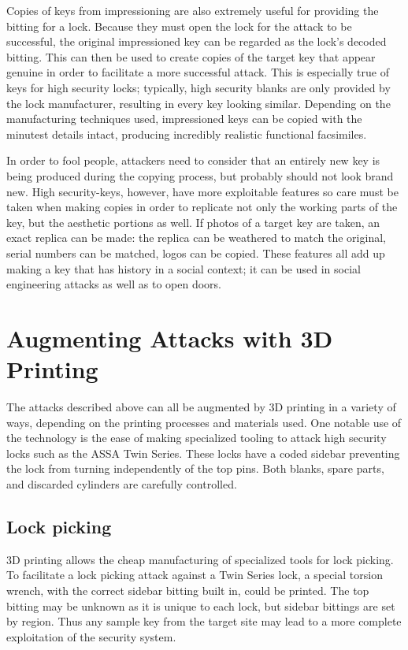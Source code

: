 \documentclass{acm_proc_article-sp}
\begin{document}
Copies of keys from impressioning are also extremely useful for providing the bitting for a lock. Because they must open the lock for the attack to be successful, the original impressioned key can be regarded as the lock's decoded bitting. This can then be used to create copies of the target key that appear genuine in order to facilitate a more successful attack. This is especially true of keys for high security locks; typically, high security blanks are only provided by the lock manufacturer, resulting in every key looking similar. Depending on the manufacturing techniques used, impressioned keys can be copied with the minutest details intact, producing incredibly realistic functional facsimiles.

In order to fool people, attackers need to consider that an entirely new key is being produced during the copying process, but probably should not look brand new. High security-keys, however, have more exploitable features so care must be taken when making copies in order to replicate not only the working parts of the key, but the aesthetic portions as well. If photos of a target key are taken, an exact replica can be made: the replica can be weathered to match the original, serial numbers can be matched, logos can be copied. These features all add up making a key that has history in a social context; it can be used in social engineering attacks as well as to open doors.

\section{Augmenting Attacks with 3D Printing}
The attacks described above can all be augmented by 3D printing in a variety of ways, depending on the printing processes and materials used. One notable use of the technology is the ease of making specialized tooling to attack high security locks such as the ASSA Twin Series. These locks have a coded sidebar preventing the lock from turning independently of the top pins. Both blanks, spare parts, and discarded cylinders are carefully controlled.

\subsection{Lock picking}
3D printing allows the cheap manufacturing of specialized tools for lock picking. To facilitate a lock picking attack against a Twin Series lock, a special torsion wrench, with the correct sidebar bitting built in, could be printed. The top bitting may be unknown as it is unique to each lock, but sidebar bittings are set by region. Thus any sample key from the target site may lead to a more complete exploitation of the security system.
\end{document}

